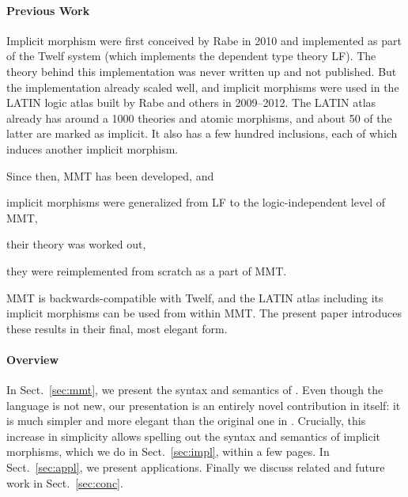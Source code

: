 \paragraph{Previous Work}
Implicit morphism were first conceived by Rabe in 2010 and implemented as part of the Twelf system \cite{twelf} (which implements the dependent type theory LF).
The theory behind this implementation was never written up and not published.
But the implementation already scaled well, and implicit morphisms were used in the LATIN logic atlas \cite{CHKMR:latinabs} built by Rabe and others in 2009--2012.
The LATIN atlas already has around a 1000 theories and atomic morphisms, and about 50 of the latter are marked as implicit.
It also has a few hundred inclusions, each of which induces another implicit morphism.

Since then, MMT has been developed, and
\begin{compactitem}
 \item implicit morphisms were generalized from LF to the logic-independent level of MMT,
 \item their theory was worked out,
 \item they were reimplemented from scratch as a part of MMT.
\end{compactitem}
MMT is backwards-compatible with Twelf, and the LATIN atlas including its implicit morphisms can be used from within MMT.
The present paper introduces these results in their final, most elegant form.

\paragraph{Overview}
In Sect.~\ref{sec:mmt}, we present the syntax and semantics of \mmt.
Even though the \mmt language is not new, our presentation is an entirely novel contribution in itself: it is much simpler and more elegant than the original one in \cite{RK:mmt:10}.
%
Crucially, this increase in simplicity allows spelling out the syntax and semantics of implicit morphisms, which we do in Sect.~\ref{sec:impl}, within a few pages.
In Sect.~\ref{sec:appl}, we present applications.
Finally we discuss related and future work in Sect.~\ref{sec:conc}.

